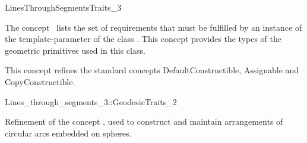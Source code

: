 
\begin{ccRefConcept}{LinesThroughSegmentsTraits_3}

\ccDefinition
  
The concept \ccRefName\ lists the set of requirements that must be fulfilled by
an instance of the  template-parameter of
the class .
This concept provides the types of the geometric primitives used in
this class.

\ccTypes
{}
\ccGlue
{}
\ccGlue
{}
\ccGlue
{}

\ccCreation
This concept refines the standard concepts DefaultConstructible, Assignable and
CopyConstructible.




\ccHasModels
{}

\ccSeeAlso
{}

\end{ccRefConcept}


\begin{ccRefConcept}{Lines_through_segments_3::GeodesicTraits_2}

\ccDefinition
Refinement of the concept , used to construct and maintain arrangements of circular arcs embedded on spheres. 

\ccHasModels
{}

\end{ccRefConcept}

